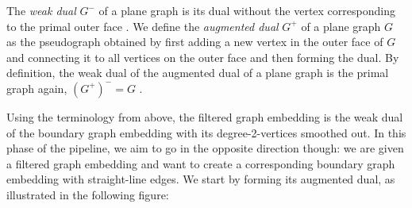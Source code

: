 The \emph{weak dual} $G^-$ of a plane graph is its dual without the vertex corresponding to the primal outer face \cite{fleischner1974}. We define the \emph{augmented dual} $G^+$ of a plane graph $G$ as the pseudograph obtained by first adding a new vertex in the outer face of $G$ and connecting it to all vertices on the outer face and then forming the dual. By definition, the weak dual of the augmented dual of a plane graph is the primal graph again, \ie{} $(G^+)^- = G$ \cite{fleischner1974}.

Using the terminology from above, the filtered graph embedding is the weak dual of the boundary graph embedding with its degree-2-vertices smoothed out. In this phase of the pipeline, we aim to go in the opposite direction though: we are given a filtered graph embedding and want to create a corresponding boundary graph embedding with straight-line edges. We start by forming its augmented dual, as illustrated in the following figure:

